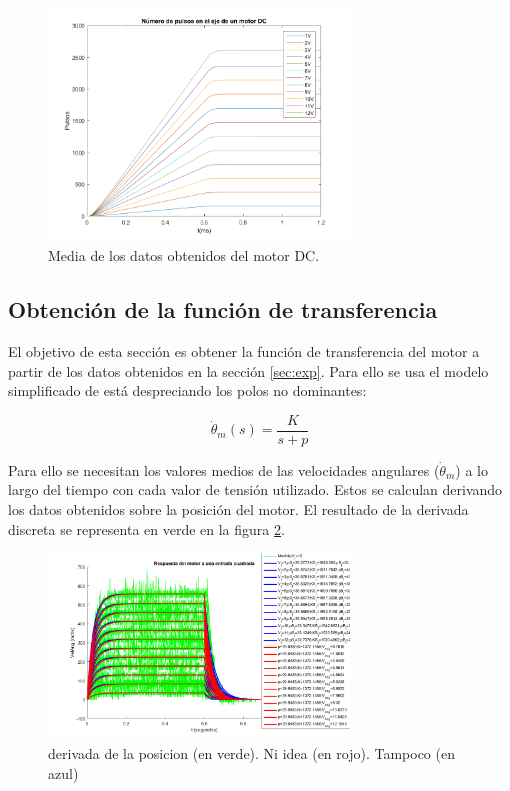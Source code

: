 \documentclass[a4paper]{article}
\begin{document}
\begin{figure}[hbp]
	\begin{center}
		\includegraphics[width=8cm]{n_pulsos}
		\caption{Media de los datos obtenidos del motor DC.}
		\label{datos}
	\end{center}
\end{figure}

\subsection{Obtención de la función de transferencia}
El objetivo de esta sección es obtener la función de transferencia del motor a partir de los datos obtenidos en la sección \ref{sec:exp}.
Para ello se usa el modelo simplificado de está despreciando los polos no dominantes:

\begin{equation}
	\label{eq:trans}
	\dot{\theta}_m (s) = \frac{K}{s+p}
\end{equation}


Para ello se necesitan los valores medios de las velocidades angulares ($\dot{\theta}_m$) a lo largo del tiempo con cada valor de tensión utilizado.
Estos se calculan derivando los datos obtenidos sobre la posición del motor. El resultado de la derivada discreta se representa en verde en la figura \ref{velAng}.

\begin{figure}[htbp]
	\begin{center}

		\includegraphics[width=8cm]{vel_ang}
		\caption{derivada de la posicion (en verde). Ni idea (en rojo). Tampoco (en azul)}
		\label{velAng}
	\end{center}
\end{figure}
\end{document}
